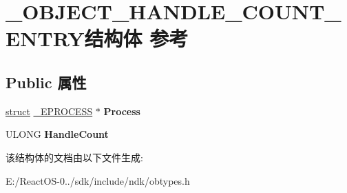 \hypertarget{struct___o_b_j_e_c_t___h_a_n_d_l_e___c_o_u_n_t___e_n_t_r_y}{}\section{\+\_\+\+O\+B\+J\+E\+C\+T\+\_\+\+H\+A\+N\+D\+L\+E\+\_\+\+C\+O\+U\+N\+T\+\_\+\+E\+N\+T\+R\+Y结构体 参考}
\label{struct___o_b_j_e_c_t___h_a_n_d_l_e___c_o_u_n_t___e_n_t_r_y}
\subsection*{Public 属性}
\begin{DoxyCompactItemize}
\item 
\mbox{\label{struct___o_b_j_e_c_t___h_a_n_d_l_e___c_o_u_n_t___e_n_t_r_y_a3a7a4ac823c89e3b373b2b19c8be5c8c}} 
\hyperlink{interfacestruct}{struct} \hyperlink{struct___e_p_r_o_c_e_s_s}{\+\_\+\+E\+P\+R\+O\+C\+E\+SS} $\ast$ {\bfseries Process}
\item 
\mbox{\label{struct___o_b_j_e_c_t___h_a_n_d_l_e___c_o_u_n_t___e_n_t_r_y_a0f3510667b0c73957737e990f9f5b251}} 
U\+L\+O\+NG {\bfseries Handle\+Count}
\end{DoxyCompactItemize}


该结构体的文档由以下文件生成\+:\begin{DoxyCompactItemize}
\item 
E\+:/\+React\+O\+S-\/0../sdk/include/ndk/obtypes.\+h\end{DoxyCompactItemize}
